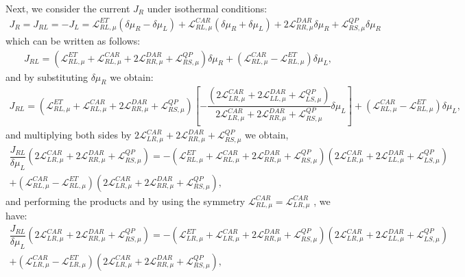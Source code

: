 Next, we consider the current $J_{R}$ under isothermal conditions:
\begin{align*}
J_{R}=J_{RL}=-J_{L}=
\mathcal{L}_{RL,\mu}^{ET}(\delta\mu_{R}-\delta\mu_{L})+
\mathcal{L}_{RL,\mu}^{CAR}\left(\delta\mu_{R}+\delta\mu_{L}\right)
+
2\mathcal{L}_{RR,\mu}^{DAR}\delta\mu_{R}
+
\mathcal{L}^{QP}_{RS,\mu}\delta\mu_{R}
\end{align*}
which can be written as follows:
\begin{align*}
J_{RL}=
(\mathcal{L}_{RL,\mu}^{ET}+\mathcal{L}_{RL,\mu}^{CAR}+2\mathcal{L}_{RR,\mu}^{DAR}+\mathcal{L}^{QP}_{RS,\mu})\delta\mu_{R}
+
(\mathcal{L}_{RL,\mu}^{CAR}
-
\mathcal{L}_{RL,\mu}^{ET})\delta\mu_{L},
\end{align*}
and by substituting $\delta\mu_{R}$ we obtain:
\begin{align*}
J_{RL}=
(\mathcal{L}_{RL,\mu}^{ET}+\mathcal{L}_{RL,\mu}^{CAR}+2\mathcal{L}_{RR,\mu}^{DAR}+\mathcal{L}^{QP}_{RS,\mu})\left[-\dfrac{(2\mathcal{L}_{LR,\mu}^{CAR}+
2\mathcal{L}_{LL,\mu}^{DAR}+
\mathcal{L}^{QP}_{LS,\mu})}{2\mathcal{L}_{LR,\mu}^{CAR}
+
2\mathcal{L}_{RR,\mu}^{DAR}
+
\mathcal{L}^{QP}_{RS,\mu}}\delta\mu_{L}\right]
+
(\mathcal{L}_{RL,\mu}^{CAR}
-
\mathcal{L}_{RL,\mu}^{ET})\delta\mu_{L},
\end{align*}
and multiplying both sides by $2\mathcal{L}_{LR,\mu}^{CAR}
+
2\mathcal{L}_{RR,\mu}^{DAR}
+
\mathcal{L}^{QP}_{RS,\mu}$ we obtain,
\begin{multline*}
\dfrac{J_{RL}}{\delta\mu_{L}}(2\mathcal{L}_{LR,\mu}^{CAR}
+
2\mathcal{L}_{RR,\mu}^{DAR}
+
\mathcal{L}^{QP}_{RS,\mu})
=-
(\mathcal{L}_{RL,\mu}^{ET}+\mathcal{L}_{RL,\mu}^{CAR}+2\mathcal{L}_{RR,\mu}^{DAR}+\mathcal{L}^{QP}_{RS,\mu})(2\mathcal{L}_{LR,\mu}^{CAR}+
2\mathcal{L}_{LL,\mu}^{DAR}+
\mathcal{L}^{QP}_{LS,\mu})
\\+
(\mathcal{L}_{RL,\mu}^{CAR}
-
\mathcal{L}_{RL,\mu}^{ET})(2\mathcal{L}_{LR,\mu}^{CAR}
+
2\mathcal{L}_{RR,\mu}^{DAR}
+
\mathcal{L}^{QP}_{RS,\mu}),
\end{multline*}
and performing the products and by using the symmetry $\mathcal{L}_{RL,\mu}^{CAR}=\mathcal{L}_{LR,\mu}^{CAR}$ , we have:
\begin{multline*}
\dfrac{J_{RL}}{\delta\mu_{L}}(2\mathcal{L}_{LR,\mu}^{CAR}
+
2\mathcal{L}_{RR,\mu}^{DAR}
+
\mathcal{L}^{QP}_{RS,\mu})
=-
(\mathcal{L}_{LR,\mu}^{ET}+\mathcal{L}_{LR,\mu}^{CAR}+2\mathcal{L}_{RR,\mu}^{DAR}+\mathcal{L}^{QP}_{RS,\mu})(2\mathcal{L}_{LR,\mu}^{CAR}+
2\mathcal{L}_{LL,\mu}^{DAR}+
\mathcal{L}^{QP}_{LS,\mu})
\\+
(\mathcal{L}_{LR,\mu}^{CAR}
-
\mathcal{L}_{LR,\mu}^{ET})(2\mathcal{L}_{LR,\mu}^{CAR}
+
2\mathcal{L}_{RR,\mu}^{DAR}
+
\mathcal{L}^{QP}_{RS,\mu}),
\end{multline*}
